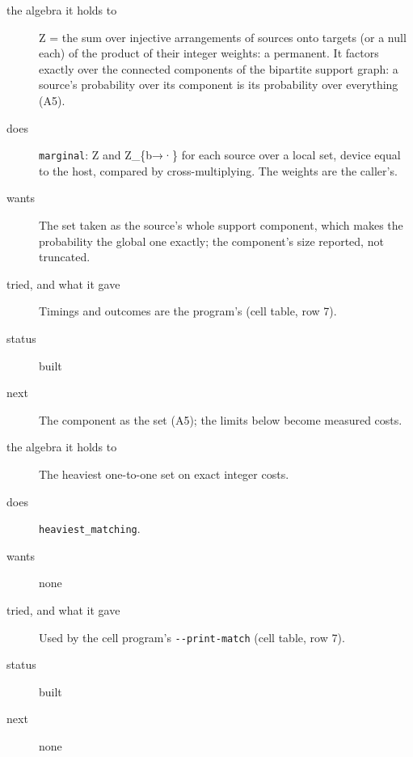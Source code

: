 \begin{description}
\item[{the algebra it holds to}] Z = the sum over injective arrangements of sources onto targets (or a null each) of the product of their integer weights: a permanent. It factors exactly over the connected components of the bipartite support graph: a source's probability over its component is its probability over everything (A5).
\item[{does}] \texttt{marginal}: Z and Z\_\allowbreak{}\{b→·\} for each source over a local set, device equal to the host, compared by cross-multiplying. The weights are the caller's.
\item[{wants}] The set taken as the source's whole support component, which makes the probability the global one exactly; the component's size reported, not truncated.
\item[{tried, and what it gave}] Timings and outcomes are the program's (cell table, row 7).
\item[{status}] built
\item[{next}] The component as the set (A5); the limits below become measured costs.
\end{description}

\begin{description}
\item[{the algebra it holds to}] The heaviest one-to-one set on exact integer costs.
\item[{does}] \texttt{heaviest\_\allowbreak{}matching}.
\item[{wants}] none
\item[{tried, and what it gave}] Used by the cell program's \texttt{-\allowbreak{}-\allowbreak{}print-\allowbreak{}match} (cell table, row 7).
\item[{status}] built
\item[{next}] none
\end{description}

